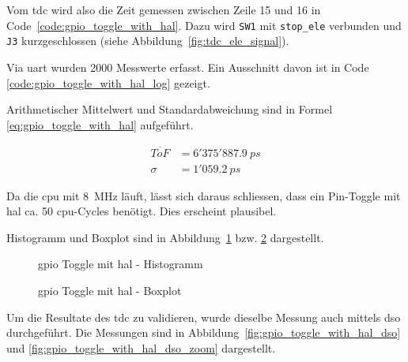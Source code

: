 \documentclass[11pt,a4paper,hidelinks]{article}
\begin{document}


Vom \acrshort{tdc} wird also die Zeit gemessen zwischen Zeile 15 und 16 in Code~\ref{code:gpio_toggle_with_hal}. Dazu
wird \lstinline|SW1| mit \lstinline|stop_ele| verbunden und \lstinline|J3| kurzgeschlossen (siehe
Abbildung~\ref{fig:tdc_ele_signal}).

Via \acrshort{uart} wurden 2000 Messwerte erfasst. Ein Ausschnitt davon ist in Code \ref{code:gpio_toggle_with_hal_log}
gezeigt.



Arithmetischer Mittelwert und Standardabweichung sind in Formel \ref{eq:gpio_toggle_with_hal} aufgeführt.

\begin{equation}\label{eq:gpio_toggle_with_hal}
    \begin{split}
        \overline{ToF} &= 6'375'887.9~ps\\
        \sigma         &= 1'059.2~ps
    \end{split}
\end{equation}

Da die \acrshort{cpu} mit 8~MHz läuft, lässt sich daraus schliessen, dass ein Pin-Toggle mit \acrshort{hal} ca. 50
\acrshort{cpu}-Cycles benötigt. Dies erscheint plausibel.

Histogramm und Boxplot sind in Abbildung~\ref{fig:gpio_toggle_with_hal_histogram} bzw.
\ref{fig:gpio_toggle_with_hal_boxplot} dargestellt.

\begin{figure}[H]
    \centering
    
    \caption{\acrshort{gpio} Toggle mit \acrshort{hal} - Histogramm}\label{fig:gpio_toggle_with_hal_histogram}
\end{figure}

\begin{figure}[H]
    \centering
    
    \caption{\acrshort{gpio} Toggle mit \acrshort{hal} - Boxplot}\label{fig:gpio_toggle_with_hal_boxplot}
\end{figure}

Um die Resultate des \acrshort{tdc} zu validieren, wurde dieselbe Messung auch mittels \acrfull{dso} durchgeführt. Die
Messungen sind in Abbildung~\ref{fig:gpio_toggle_with_hal_dso} und \ref{fig:gpio_toggle_with_hal_dso_zoom} dargestellt.
\end{document}
